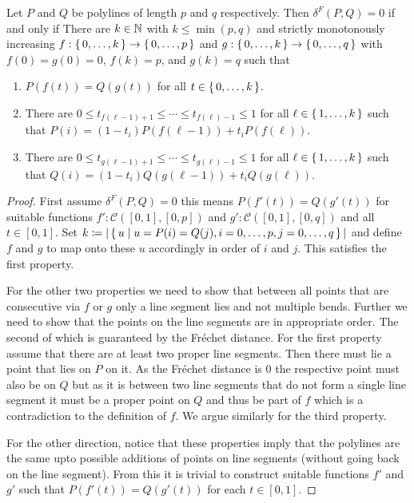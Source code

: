 \begin{lemma}\label{lem:polyline_dist0}
	Let \(P\) and \(Q\) be polylines of length \(p\) and \(q\) respectively. Then \(\delta^F(P, Q) = 0\) if and only if 
	There are \(k \in \mathbb{N}\) with \(k \leq \min(p, q)\) and strictly monotonously increasing \(f:\set{0,\dots,k} \to \set{0,\dots,p}\) and \(g:\set{0,\dots,k} \to \set{0,\dots,q}\) with \(f(0) = g(0) = 0\), \(f(k) = p\), and \(g(k) = q\) such that 
	\begin{enumerate}
		\item \(P(f(t)) = Q(g(t))\) for all \(t \in \set{0, \dots, k}\).
		\item There are \(0 \leq t_{f(\ell-1)+1} \leq \cdots \leq t_{f(\ell)-1} \leq 1\) for all \(\ell \in \set{1, \dots, k}\) such that \newline \(P(i) = (1-t_i)P(f(\ell - 1)) + t_iP(f(\ell))\).
		\item There are \(0 \leq t_{g(\ell-1)+1} \leq \cdots \leq t_{g(\ell)-1} \leq 1\) for all \(\ell \in \set{1, \dots, k}\) such that \newline \(Q(i) = (1-t_i)Q(g(\ell - 1)) + t_iQ(g(\ell))\).
	\end{enumerate}
\end{lemma}

\begin{proof}
	First assume \(\delta^F(P, Q) = 0\) this means \(P(f'(t)) = Q(g'(t))\) for suitable functions \(f':\mathcal{C}([0,1], [0,p])\) and \(g':\mathcal{C}([0,1], [0,q])\) and all \(t \in [0,1]\). Set \(k \coloneq |\set{u \mid u = P(i) = Q(j), i = 0, \dots, p, j = 0, \dots, q}|\) and define \(f\) and \(g\) to map onto these \(u\) accordingly in order of \(i\) and \(j\). This satisfies the first property.

	For the other two properties we need to show that between all points that are consecutive via \(f\) or \(g\) only a line segment lies and not multiple bends. Further we need to show that the points on the line segments are in appropriate order. The second of which is guaranteed by the Fréchet distance. For the first property assume that there are at least two proper line segments. Then there must lie a point that lies on \(P\) on it. As the Fréchet distance is \(0\) the respective point must also be on \(Q\) but as it is between two line segments that do not form a single line segment it must be a proper point on \(Q\) and thus be part of \(f\) which is a contradiction to the definition of \(f\). We argue similarly for the third property.

	For the other direction, notice that these properties imply that the polylines are the same upto possible additions of points on line segments (without going back on the line segment). From this it is trivial to construct suitable functions \(f'\) and \(g'\) such that \(P(f'(t)) = Q(g'(t))\) for each \(t \in [0, 1]\).
\end{proof}

